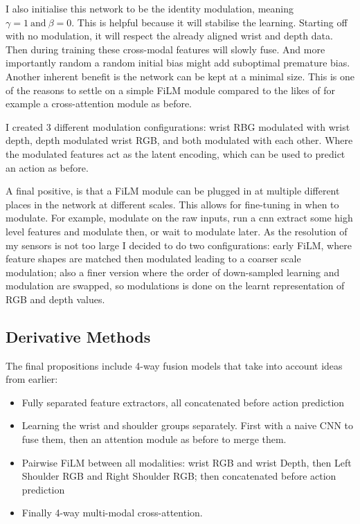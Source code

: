 I also initialise this network to be the identity modulation, meaning \(\gamma = 1 ~\text{and} ~\beta = 0\). This is helpful because it will stabilise the learning. Starting off with no modulation, it will respect the already aligned wrist and depth data. Then during training these cross-modal features will slowly fuse. And more importantly random a random initial bias might add suboptimal premature bias. Another inherent benefit is the network can be kept at a minimal size. This is one of the reasons to settle on a simple FiLM module compared to the likes of for example a cross-attention module as before. 

I created 3 different modulation configurations: wrist RBG modulated with wrist depth, depth modulated wrist RGB, and both modulated with each other. Where the modulated features act as the latent encoding, which can be used to predict an action as before.

A final positive, is that a FiLM module can be plugged in at multiple different places in the network at different scales. This allows for fine-tuning in when to modulate. For example, modulate on the raw inputs, run a cnn extract some high level features and modulate then, or wait to modulate later. As the resolution of my sensors is not too large I decided to do two configurations: early FiLM, where feature shapes are matched then modulated leading to a coarser scale modulation; also a finer version where the order of down-sampled learning and modulation are swapped, so modulations is done on the learnt representation of RGB and depth values.


\subsection{Derivative Methods}\label{subsec:derivative-methods}
The final propositions include 4-way fusion models that take into account ideas from earlier:
\begin{itemize}
  \item Fully separated feature extractors, all concatenated before action prediction 
  \item Learning the wrist and shoulder groups separately. First with a naive CNN to fuse them, then an attention module as before to merge them.
  \item Pairwise FiLM between all modalities: wrist RGB and wrist Depth, then Left Shoulder RGB and Right Shoulder RGB; then concatenated before action prediction
  \item Finally 4-way multi-modal cross-attention. 
\end{itemize}

